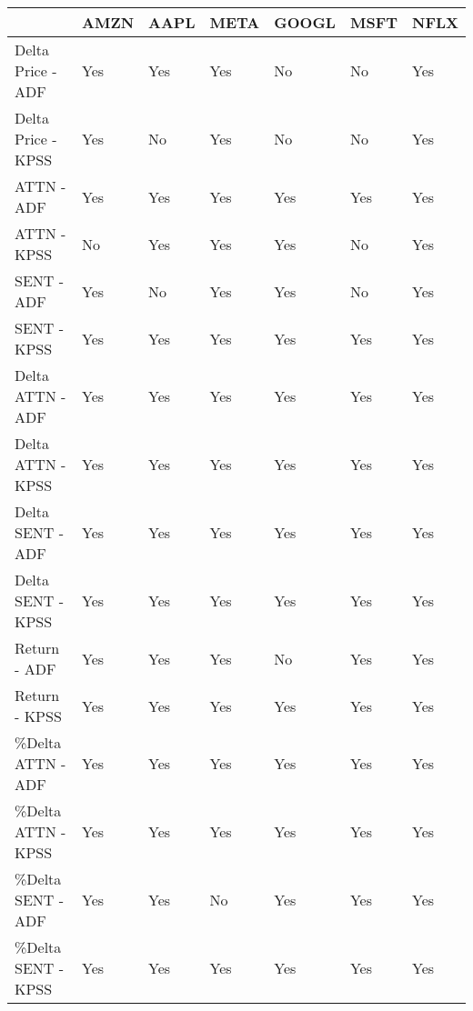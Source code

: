 \begin{tabular}{lllllll}
\toprule
{} & AMZN & AAPL & META & GOOGL & MSFT & NFLX \\
\midrule
Delta Price - ADF  &  Yes &  Yes &  Yes &    No &   No &  Yes \\
Delta Price - KPSS &  Yes &   No &  Yes &    No &   No &  Yes \\
ATTN - ADF         &  Yes &  Yes &  Yes &   Yes &  Yes &  Yes \\
ATTN - KPSS        &   No &  Yes &  Yes &   Yes &   No &  Yes \\
SENT - ADF         &  Yes &   No &  Yes &   Yes &   No &  Yes \\
SENT - KPSS        &  Yes &  Yes &  Yes &   Yes &  Yes &  Yes \\
Delta ATTN - ADF   &  Yes &  Yes &  Yes &   Yes &  Yes &  Yes \\
Delta ATTN - KPSS  &  Yes &  Yes &  Yes &   Yes &  Yes &  Yes \\
Delta SENT - ADF   &  Yes &  Yes &  Yes &   Yes &  Yes &  Yes \\
Delta SENT - KPSS  &  Yes &  Yes &  Yes &   Yes &  Yes &  Yes \\
Return - ADF       &  Yes &  Yes &  Yes &    No &  Yes &  Yes \\
Return - KPSS      &  Yes &  Yes &  Yes &   Yes &  Yes &  Yes \\
\%Delta ATTN - ADF  &  Yes &  Yes &  Yes &   Yes &  Yes &  Yes \\
\%Delta ATTN - KPSS &  Yes &  Yes &  Yes &   Yes &  Yes &  Yes \\
\%Delta SENT - ADF  &  Yes &  Yes &   No &   Yes &  Yes &  Yes \\
\%Delta SENT - KPSS &  Yes &  Yes &  Yes &   Yes &  Yes &  Yes \\
\bottomrule
\end{tabular}
